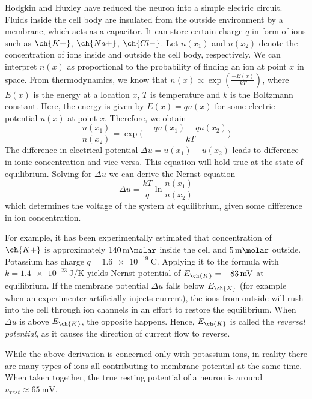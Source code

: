 \documentclass[oneside,english,logo]{amuthesis}
\begin{document}
Hodgkin and Huxley have reduced the neuron into a simple electric circuit. Fluids inside the cell body are insulated from the outside environment by a membrane, which acts as a capacitor. It can store certain charge $q$ in form of ions such as $\ch{K+}$, $\ch{Na+}$, $\ch{Cl-}$. Let $n(x_1)$ and $n(x_2)$ denote the concentration of ions inside and outside the cell body, respectively. We can interpret $n(x)$ as proportional to the probability of finding an ion at point $x$ in space. From thermodynamics, we know that 
$n(x)\propto \exp(\frac{-E(x)}{kT})$, 
where $E(x)$ is the energy at a location $x$, $T$ is temperature and $k$ is the Boltzmann constant. Here, the energy is given by $E(x)=q u(x)$ for some electric potential $u(x)$ at point $x$. Therefore, we obtain
\[
\frac{n(x_1)}{n(x_2)} = \exp\big(-\frac{qu(x_1)-qu(x_2)}{kT}\big)
\]
The difference in electrical potential $\Delta u = u(x_1) - u(x_2)$ leads to  difference in ionic concentration and vice versa. This equation will hold true at the state of equilibrium. Solving for $\Delta u$ we can derive the Nernst equation 
\[
\Delta u = \frac{kT}{q}\ln\frac{n(x_1)}{n(x_2)}
\]
which determines the voltage of the system at equilibrium, given some difference in ion concentration. 
 
For example, it has been experimentally estimated that concentration of $\ch{K+}$ is approximately $\SI{140}{\milli\molar}$ inside the cell  and  $\SI{5}{\milli\molar}$ outside. Potassium has charge $q=\SI{1.6e-19}{\coulomb}$. Applying it to the formula with $k=\SI{1.4e-23}{\joule/\kelvin}$ yields Nernst potential of $E_{\ch{K}}=\SI{-83}{\milli\volt}$ at equilibrium. If the membrane potential $\Delta u$ falls below $E_{\ch{K}}$ (for example when an experimenter artificially injects current), the ions from outside will rush into the cell through ion channels in an effort to restore the equilibrium. When $\Delta u$ is above $E_{\ch{K}}$, the opposite happens. Hence, $E_{\ch{K}}$ is called the \textit{reversal potential}, as it causes the direction of current flow to reverse.

While the above derivation is concerned only with potassium ions, in reality there are many types of ions all contributing to membrane potential at the same time. When taken together, the true resting potential of a neuron is around $u_{rest} \approx \SI{65}{\milli\volt}$.
\end{document}
